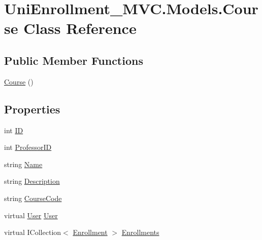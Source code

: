 \hypertarget{class_uni_enrollment___m_v_c_1_1_models_1_1_course}{}\section{Uni\+Enrollment\+\_\+\+M\+V\+C.\+Models.\+Course Class Reference}
\label{class_uni_enrollment___m_v_c_1_1_models_1_1_course}
\subsection*{Public Member Functions}
\begin{DoxyCompactItemize}
\item 
\hyperlink{class_uni_enrollment___m_v_c_1_1_models_1_1_course_a1c8fe91207bd313b87bb61434ba9e978}{Course} ()
\end{DoxyCompactItemize}
\subsection*{Properties}
\begin{DoxyCompactItemize}
\item 
int \hyperlink{class_uni_enrollment___m_v_c_1_1_models_1_1_course_ace95aa2f83a31987a37f6daf622cf0ec}{ID}
\item 
int \hyperlink{class_uni_enrollment___m_v_c_1_1_models_1_1_course_a9b8fd37bc922506e6abc112c782be3f0}{Professor\+ID}
\item 
string \hyperlink{class_uni_enrollment___m_v_c_1_1_models_1_1_course_abfc84d1ebf575b4d63af03728bc8c7ab}{Name}
\item 
string \hyperlink{class_uni_enrollment___m_v_c_1_1_models_1_1_course_a9d07427b616b5609d8ae74e155c6cb2d}{Description}
\item 
string \hyperlink{class_uni_enrollment___m_v_c_1_1_models_1_1_course_a96eb519eec923843a7a551f7fedc49f4}{Course\+Code}
\item 
virtual \hyperlink{class_uni_enrollment___m_v_c_1_1_models_1_1_user}{User} \hyperlink{class_uni_enrollment___m_v_c_1_1_models_1_1_course_a6a070699f04335e845a19a8402e25861}{User}
\item 
virtual I\+Collection$<$ \hyperlink{class_uni_enrollment___m_v_c_1_1_models_1_1_enrollment}{Enrollment} $>$ \hyperlink{class_uni_enrollment___m_v_c_1_1_models_1_1_course_aea0587dad0db95d55ab18c7dce4caf43}{Enrollments}
\end{DoxyCompactItemize}


